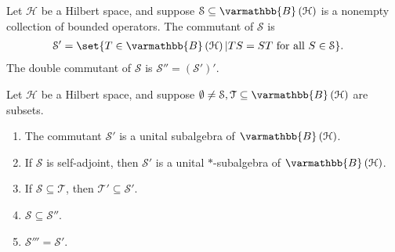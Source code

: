 \documentclass[10pt]{mypackage}
\renewcommand*{\mathbb}[1]{\varmathbb{#1}}
\newcommand{\B}{\mathbb{B}}
\begin{document}
\begin{definition}
  Let $\mathcal{H}$ be a Hilbert space, and suppose $\mathcal{S}\subseteq \B\left(\mathcal{H}\right)$ is a nonempty collection of bounded operators. The commutant of $\mathcal{S}$ is
  \begin{align*}
    \mathcal{S}' &= \set{T\in \B\left(\mathcal{H}\right) | TS = ST\text{ for all }S\in \mathcal{S}}.
  \end{align*}
  The double commutant of $\mathcal{S}$ is $\mathcal{S}'' = \left(\mathcal{S}'\right)'$.
\end{definition}
\begin{exercise}
  Let $\mathcal{H}$ be a Hilbert space, and suppose $\emptyset\neq \mathcal{S},\mathcal{T}\subseteq \B\left(\mathcal{H}\right)$ are subsets.
  \begin{enumerate}[(1)]
    \item The commutant $\mathcal{S}'$ is a unital subalgebra of $\B\left(\mathcal{H}\right)$.
    \item If $\mathcal{S}$ is self-adjoint, then $\mathcal{S}'$ is a unital $\ast$-subalgebra of $\B\left(\mathcal{H}\right)$.
    \item If $\mathcal{S}\subseteq \mathcal{T}$, then $\mathcal{T}' \subseteq \mathcal{S}'$.
    \item $\mathcal{S}\subseteq \mathcal{S}''$.
    \item $\mathcal{S}''' = \mathcal{S}'$.
  \end{enumerate}
\end{exercise}
\end{document}

